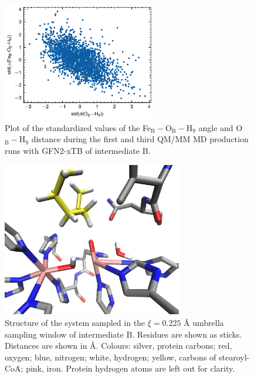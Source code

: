 \begin{figure}[htbp]
    \centering
    \includegraphics[width=0.6\textwidth]{Figures/2D_plot_starting_frame.pdf}
    \caption{Plot of the standardized values of the Fe$_{\text{B}}-$O$_{\text{B}}-$H$_{\text{9}}$ angle and O$_{\text{B}}-$H$_{\text{9}}$ distance during the first and third QM/MM MD production runs with GFN2-xTB of intermediate B.}
    \label{fig:starting_frame}
\end{figure}

\begin{figure}[htbp]
    \centering
    \includegraphics[width=0.7\textwidth]{Figures/pmf_window_28.png}
    \caption{Structure of the system sampled in the $\xi=0.225$ Å umbrella sampling window of intermediate B. Residues are shown as sticks. Distances are shown in Å. Colours: silver, protein carbons; red, oxygen; blue, nitrogen; white, hydrogen; yellow, carbons of stearoyl-CoA; pink, iron. Protein hydrogen atoms are left out for clarity.}
    \label{fig:pmf_window_28}
\end{figure}